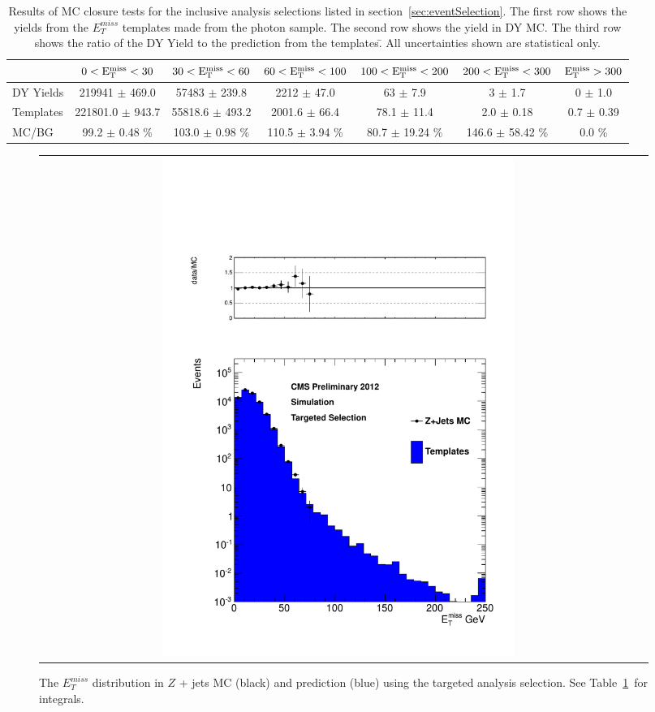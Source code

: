 \begin{table}[htb]
\scriptsize
\begin{center}
\caption{\label{table:inclusive} Results of MC closure tests for the inclusive analysis selections listed in section~\ref{sec:eventSelection}. The first row shows the yields from the $E^{miss}_T$ templates made from the photon sample. The second row shows the yield in DY MC. The third row shows the ratio of the DY Yield to the prediction from the templates.̄ All uncertainties shown are statistical only. }
\begin{tabular}{l|c|c|c|c|c|c}
\hline
\hline
          & $0 < \rm{E_{T}^{miss}} < 30$  & $30 < \rm{E_{T}^{miss}} < 60$  & $60 < \rm{E_{T}^{miss}} < 100$  & $100 < \rm{E_{T}^{miss}} < 200$  & $200 < \rm{E_{T}^{miss}} < 300$  &    $\rm{E_{T}^{miss}} > 300$  \\ 
\hline
DY Yields & 219941 $\pm$ 469.0 & 57483 $\pm$ 239.8 &  2212 $\pm$ 47.0 &     63 $\pm$ 7.9 &      3 $\pm$ 1.7 &      0 $\pm$ 1.0 \\
Templates & 221801.0 $\pm$ 943.7 & 55818.6 $\pm$ 493.2 & 2001.6 $\pm$ 66.4 & 78.1 $\pm$ 11.4 &   2.0 $\pm$ 0.18 &   0.7 $\pm$ 0.39 \\
    MC/BG & 99.2 $\pm$ 0.48 \% & 103.0 $\pm$ 0.98 \% & 110.5 $\pm$ 3.94 \% & 80.7 $\pm$ 19.24 \% & 146.6 $\pm$ 58.42 \% & 0.0 \% \\
\hline
\hline
\end{tabular}
\end{center}
\end{table}

\begin{figure}[!h]
\begin{center}
\begin{tabular}{cc}
\includegraphics[width=0.6\textwidth]{plots/closure_targeted.pdf}
\end{tabular}
\caption{The $E^{miss}_T$ distribution in $Z$ + jets MC (black) and prediction (blue) using the targeted analysis selection. See Table~\ref{table:inclusive}~for integrals.
\label{fig:targetedclosure}
}
\end{center}
\end{figure}

